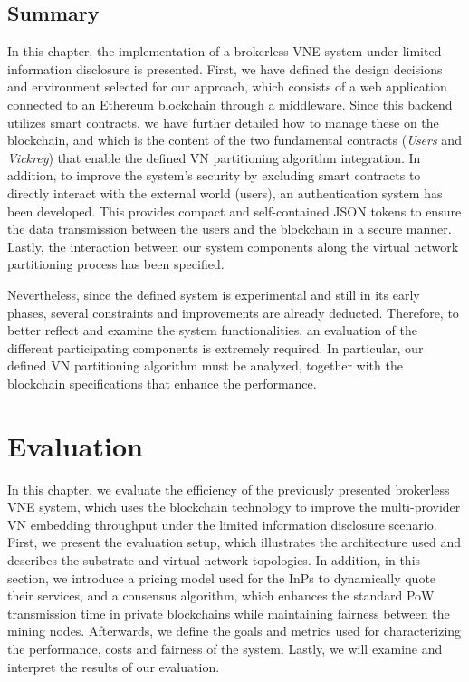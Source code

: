 \section{Summary}

In this chapter, the implementation of a brokerless VNE system under limited information disclosure is presented. First, we have defined the design decisions and environment selected for our approach, which consists of a web application connected to an Ethereum blockchain through a middleware. Since this backend utilizes smart contracts, we have further detailed how to manage these on the blockchain, and which is the content of the two fundamental contracts (\textit{Users} and \textit{Vickrey}) that enable the defined VN partitioning algorithm integration. In addition, to improve the system's security by excluding smart contracts to directly interact with the external world (users), an authentication system has been developed. This provides compact and self-contained JSON tokens to ensure the data transmission between the users and the blockchain in a secure manner. Lastly, the interaction between our system components along the virtual network partitioning process has been specified.

Nevertheless, since the defined system is experimental and still in its early phases, several constraints and improvements are already deducted. Therefore, to better reflect and examine the system functionalities, an evaluation of the different participating components is extremely required. In particular, our defined VN partitioning algorithm must be analyzed, together with the blockchain specifications that enhance the performance.


\chapter{Evaluation}
\label{ch:evaluation}

In this chapter, we evaluate the efficiency of the previously presented brokerless VNE system, which uses the blockchain technology to improve the multi-provider VN embedding throughput under the limited information disclosure scenario. First, we present the evaluation setup, which illustrates the architecture used and describes the substrate and virtual network topologies. In addition, in this section, we introduce a pricing model used for the InPs to dynamically quote their services, and a consensus algorithm, which enhances the standard PoW transmission time in private blockchains while maintaining fairness between the mining nodes. Afterwards, we define the goals and metrics used for characterizing the performance, costs and fairness of the system. Lastly, we will examine and interpret the results of our evaluation.

